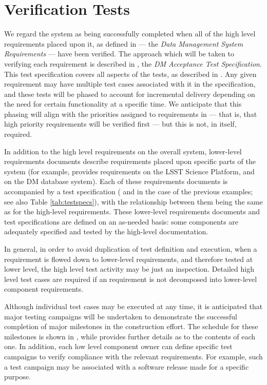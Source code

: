 \section{Verification Tests \label{sect:approach}}

We regard the system as being successfully completed when all of the high level requirements placed upon it, as defined in  --- the \emph{Data Management System Requirements} --- have been verified.
The approach which will be taken to verifying each requirement is described in , the \emph{DM Acceptance Test Specification}.
This test specification covers all aspects of the tests, as described in .
Any given requirement may have multiple test cases associated with it in the specification, and these tests will be phased to account for incremental delivery depending on the need for certain functionality at a specific time.
We anticipate that this phasing will align with the priorities assigned to requirements in  --- that is, that high priority requirements will be verified first --- but this is not, in itself, required.

In addition to the high level requirements on the overall \product{} system, lower-level requirements documents describe requirements placed upon specific parts of the system (for example,  provides requirements on the LSST Science Platform, and  on the DM database system).
Each of these requirements documents is accompanied by a test specification ( and  in the case of the previous examples; see also Table \ref{tab:testspecs}), with the relationship between them being the same as for the high-level requirements.
These lower-level requirements documents and test specifications are defined on an as-needed basis: some \product{} components are adequately specified and tested by the high-level documentation.

In general, in order to avoid duplication of test definition and execution, when a requirement is flowed down to lower-level requirements, and therefore tested at lower level, the high level test activity may be just an inspection.
Detailed high level test cases are required if an  requirement is not decomposed into lower-level component requirements.

Although individual test cases may be executed at any time, it is anticipated that major testing campaigns will be undertaken to demonstrate the successful completion of major milestones in the \product{} construction effort.
The schedule for these milestones is shown in , while  provides further details as to the contents of each one.
In addition, each low level component owner can define specific test campaigns to verify compliance with the relevant requirements.
For example, such a test campaign may be associated with a software release made for a specific purpose.

